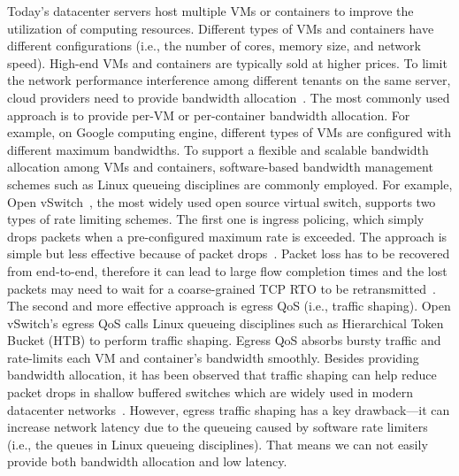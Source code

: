 Today's datacenter servers host multiple VMs or containers to improve the utilization 
of computing resources. Different types of VMs and containers have different configurations 
(i.e., the number of cores, memory size, and network speed). High-end VMs and containers 
are typically sold at higher prices. To limit the network performance interference among 
different tenants on the same server, cloud providers need to provide 
bandwidth allocation~\cite{shieh2011sharing,jeyakumar2013eyeq}. 
The most commonly used approach is to provide per-VM or per-container bandwidth allocation. 
For example, on Google computing engine, different types of VMs are configured with different 
maximum bandwidths. To support a flexible and scalable bandwidth allocation among VMs and containers, 
software-based bandwidth management schemes such as Linux queueing disciplines are commonly employed. 
For example, Open vSwitch~\cite{openvswitch}, the most widely used open source virtual switch, supports two 
types of rate limiting schemes. The first one is ingress policing, which simply drops packets when 
a pre-configured maximum rate is exceeded. The approach is simple but less effective because 
of packet drops~\cite{ovs-qos}. 
Packet loss has to be recovered from end-to-end, therefore it can lead to 
large flow completion times and the lost packets may need to wait for a coarse-grained 
TCP RTO to be retransmitted~\cite{alizadeh2010data,vasudevan2009safe}. 
The second and more effective approach is egress QoS 
(i.e., traffic shaping). Open vSwitch's egress QoS calls Linux queueing disciplines such as 
Hierarchical Token Bucket (HTB) to perform traffic shaping. Egress QoS absorbs bursty traffic 
and rate-limits each VM and container's bandwidth smoothly. Besides providing bandwidth allocation, 
it has been observed that traffic shaping can help reduce packet drops in shallow buffered switches 
which are widely used in modern datacenter networks~\cite{alizadeh2012less}. However, egress traffic shaping 
has a key drawback---it can increase network latency due to the queueing caused by 
software rate limiters (i.e., the queues in Linux queueing disciplines). 
That means we can not easily provide both bandwidth allocation and low latency.  


